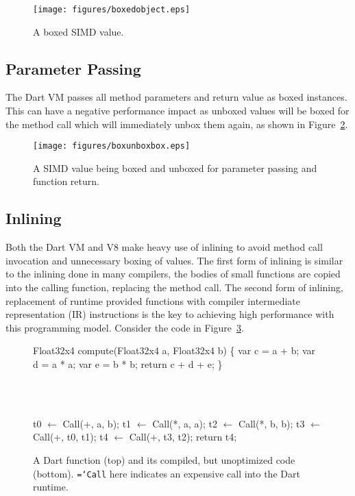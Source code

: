 \documentclass[preprint]{sigplanconf}
\newcommand{\ttt}[1]{{\texttt{\hyphenchar\font=`\-\relax #1}}}%
\begin{document}
\begin{figure}
\begin{center}
\texttt{[image: figures/boxedobject.eps]}
\end{center}
\caption{A boxed SIMD value.}
\label{fig:boxedobject}
\end{figure}

\subsection{Parameter Passing}

The Dart VM passes all method parameters and return value as boxed
instances. This can have a negative performance impact as unboxed values will be
boxed for the method call which will immediately unbox them again, as shown in
Figure~\ref{fig:boxunboxbox}.

\begin{figure}
\begin{center}
\texttt{[image: figures/boxunboxbox.eps]}
\end{center}
\caption{A SIMD value being boxed and unboxed for parameter passing and
function return.}
\label{fig:boxunboxbox}
\end{figure}

\subsection{Inlining}
\label{inlining}

Both the Dart VM and V8 make heavy use of inlining to avoid method call
invocation and unnecessary boxing of values. The first form of inlining is
similar to the inlining done in many compilers, the bodies of small functions
are copied into the calling function, replacing the method call. The second form
of inlining, replacement of runtime provided functions with compiler
intermediate representation (IR) instructions is the key to achieving high
performance with this programming model. Consider the code in
Figure~\ref{fig:unoptimized}.

\begin{figure}
\begin{small}
\begin{program}[style=tt, number=true]
Fl\tab{}oat32x4 compute(Float32x4 a, Float32x4 b) \{
  var c = a + b;
  var d = a * a;
  var e = b *  b;
  return c + d + e;\untab{}
\}
\end{program}
\end{small}
\ \ \\ \ \ \\
\begin{small}
\begin{program}[style=tt, number=true]
t0 $\leftarrow$ Call(+, a, b);
t1 $\leftarrow$ Call(*, a, a);
t2 $\leftarrow$ Call(*, b, b);
t3 $\leftarrow$ Call(+, t0, t1);
t4 $\leftarrow$ Call(+, t3, t2);
return t4;
\end{program}
\end{small}
\caption{A Dart function (top) and its compiled, but unoptimized code
(bottom). \ttt{Call} here indicates an expensive call into the Dart runtime.}
\label{fig:unoptimized}
\end{figure}
\end{document}
